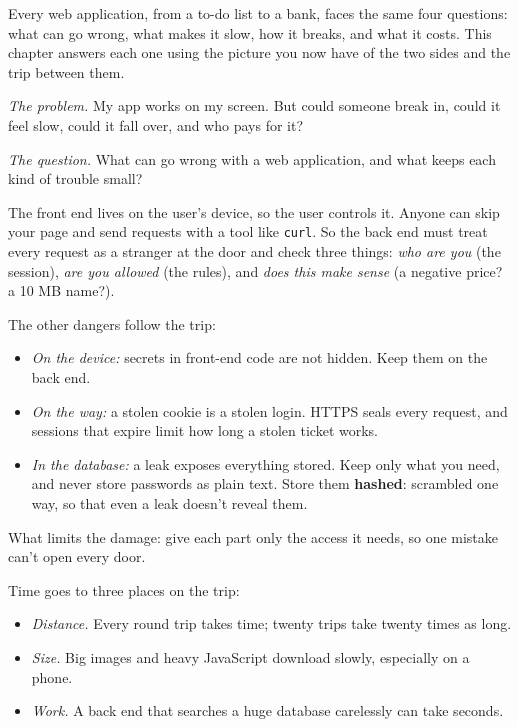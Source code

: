 \label{ch:webapp-05}

\chapterrule

Every web application, from a to-do list to a bank, faces the same four questions: what can go wrong, what makes it slow, how it breaks, and what it costs. This chapter answers each one using the picture you now have of the two sides and the trip between them.

\emph{The problem.} My app works on my screen. But could someone break in, could it feel slow, could it fall over, and who pays for it?

\emph{The question.} What can go wrong with a web application, and what keeps each kind of trouble small?

\label{webapp-05:security-what-can-go-wrong}

The front end lives on the user's device, so the user controls it. Anyone can skip your page and send requests with a tool like \texttt{curl}. So the back end must treat every request as a stranger at the door and check three things: \emph{who are you} (the session), \emph{are you allowed} (the rules), and \emph{does this make sense} (a negative price? a 10 MB name?).

The other dangers follow the trip:

\begin{itemize}
\tightlist
\item
  \emph{On the device:} secrets in front-end code are not hidden. Keep them on the back end.
\item
  \emph{On the way:} a stolen cookie is a stolen login. HTTPS seals every request, and sessions that expire limit how long a stolen ticket works.
\item
  \emph{In the database:} a leak exposes everything stored. Keep only what you need, and never store passwords as plain text. Store them \textbf{hashed}: scrambled one way, so that even a leak doesn't reveal them.
\end{itemize}

\noindent{}What limits the damage: give each part only the access it needs, so one mistake can't open every door.

\label{webapp-05:speed-what-makes-an-app-feel-slow}

Time goes to three places on the trip:

\begin{itemize}
\tightlist
\item
  \emph{Distance.} Every round trip takes time; twenty trips take twenty times as long.
\item
  \emph{Size.} Big images and heavy JavaScript download slowly, especially on a phone.
\item
  \emph{Work.} A back end that searches a huge database carelessly can take seconds.
\end{itemize}

